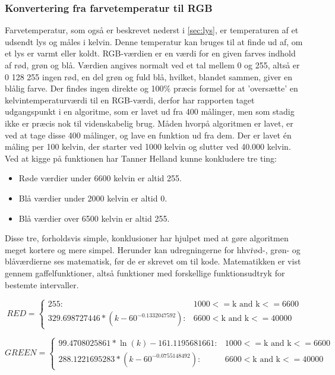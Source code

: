\subsubsection{Konvertering fra farvetemperatur til RGB}
\label{sec:temptilrgb}
Farvetemperatur, som også er beskrevet nederst i \ref{sec:lys}, er temperaturen af et udsendt lys og måles i kelvin. Denne temperatur kan bruges til at finde ud af, om et lys er varmt eller koldt. 
RGB-værdien er en værdi for en given farves indhold af rød, grøn og blå. Værdien angives normalt ved et tal mellem 0 og 255, altså er 0 128 255 ingen rød, en del grøn og fuld blå, hvilket, blandet sammen, giver en blålig farve.
Der findes ingen direkte og 100\% præcis formel for at ’oversætte’ en kelvintemperaturværdi til en RGB-værdi, derfor har rapporten taget udgangspunkt i en algoritme, som er lavet ud fra 400 målinger, men som stadig ikke er præcis nok til videnskabelig brug.
Måden hvorpå algoritmen er lavet, er ved at tage disse 400 målinger, og lave en funktion ud fra dem. Der er lavet én måling per 100 kelvin, der starter ved 1000 kelvin og slutter ved 40.000 kelvin. Ved at kigge på funktionen \cite{tanner_helland_chart} har Tanner Helland kunne konkludere  tre ting:

\begin{itemize}
\item Røde værdier under 6600 kelvin er altid 255.
\item Blå værdier under 2000 kelvin er altid 0.
\item Blå værdier over 6500 kelvin er altid 255.
\end{itemize}

Disse tre, forholdsvis simple, konklusioner har hjulpet med at gøre algoritmen meget kortere og mere simpel. Herunder kan udregningerne for hhv\. rød-, grøn- og blåværdierne ses matematisk, før de er skrevet om til kode. Matematikken er vist gennem gaffelfunktioner, altså funktioner med forskellige funktionsudtryk for bestemte intervaller.


\begin{displaymath}
   RED = \left\{
     \begin{array}{lr}
       255: & 1000 <= \text{k and k} <= 6600\\
       329.698727446*(k-60^{-0.1332047592}): & 6600< \text{k and k} <= 40000
     \end{array}
   \right.
\end{displaymath} 

\begin{displaymath}
   GREEN = \left\{
     \begin{array}{lr}
       99.4708025861*\ln(k)-161.1195681661: & 1000 <= \text{k and k} <= 6600\\
       288.1221695283*(k-60^{-0.0755148492}): & 6600< \text{k and k} <= 40000
     \end{array}
   \right.
\end{displaymath} 

